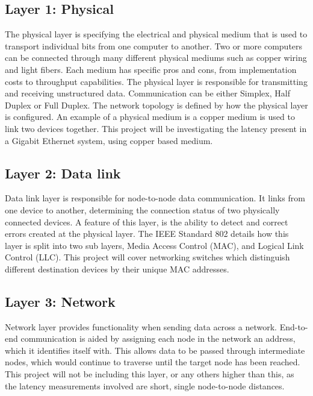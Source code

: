 \subsection{Layer 1: Physical}

\par The physical layer is specifying the electrical and physical medium that is used to transport individual bits from one computer to another.
Two or more computers can be connected through many different physical mediums such as copper wiring and light fibers. 
Each medium has specific pros and cons, from implementation costs to throughput capabilities.
The physical layer is responsible for transmitting and receiving unstructured data.
Communication can be either Simplex, Half Duplex or Full Duplex.
The network topology is defined by how the physical layer is configured.
An example of a physical medium is a copper medium is used to link two devices together.
This project will be investigating the latency present in a Gigabit Ethernet system, using copper based medium.

\subsection{Layer 2: Data link}

\par Data link layer is responsible for node-to-node data communication. 
It links from one device to another, determining the connection status of two physically connected devices.
A feature of this layer, is the ability to detect and correct errors created at the physical layer.
The IEEE Standard 802 \cite{IEEE802} details how this layer is split into two sub layers, Media Access Control (MAC), and Logical Link Control (LLC).
This project will cover networking switches which distinguish different destination devices by their unique MAC addresses.

\subsection{Layer 3: Network}

\par Network layer provides functionality when sending data across a network.
End-to-end communication is aided by assigning each node in the network an address, which it identifies itself with.
This allows data to be passed through intermediate nodes, which would continue to traverse until the target node has been reached.
This project will not be including this layer, or any others higher than this, as the latency measurements involved are short, single node-to-node distances.

